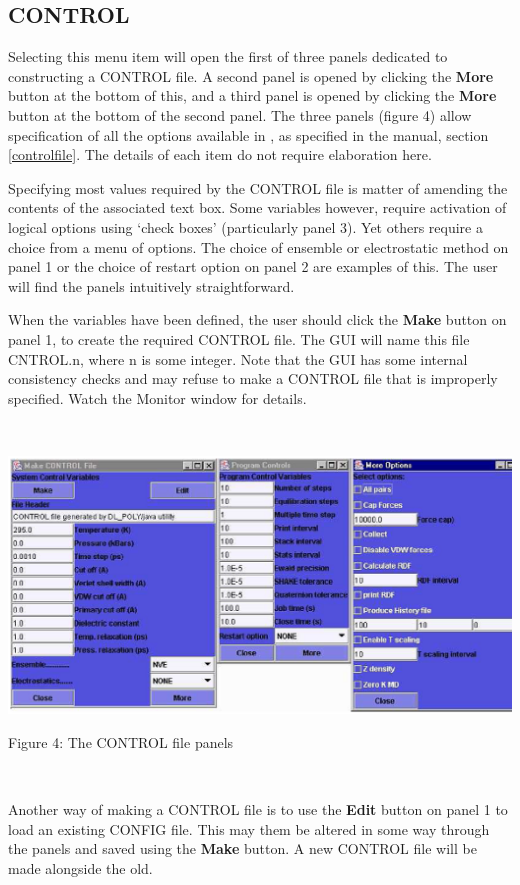 \subsection{CONTROL}

Selecting this menu item will open the first of three panels dedicated
to constructing a \DD{} CONTROL file. A second panel is opened by
clicking the {\bf More} button at the bottom of this, and a third
panel is opened by clicking the {\bf More} button at the bottom of the
second panel. The three panels (figure 4) allow specification of all
the options available in \DD{}, as specified in the \DD{} manual, section
\ref{controlfile}. The details of each item do not require elaboration here.

Specifying most values required by the CONTROL file is matter of
amending the contents of the associated text box. Some variables
however, require activation of logical options using `check boxes'
(particularly panel 3). Yet others require a choice from a menu of
options. The choice of ensemble or electrostatic method on panel 1 or
the choice of restart option on panel 2 are examples of this. The user
will find the panels intuitively straightforward.

When the variables have been defined, the user should click the {\bf
Make} button on panel 1, to create the required CONTROL file. The GUI
will name this file CNTROL.n, where n is some integer. Note that the
GUI has some internal consistency checks and may refuse to make a
CONTROL file that is improperly specified. Watch the Monitor window
for details.

~

\vskip 5mm
\centerline{\includegraphics[width=17cm]{control.ps}}
\centerline{Figure 4: The CONTROL file panels}
\vskip 5mm

~

\noindent
Another way of making a CONTROL file is to use the {\bf Edit} button
on panel 1 to load an existing CONFIG file. This may them be altered
in some way through the panels and saved using the {\bf Make}
button. A new CONTROL file will be made alongside the old. 


